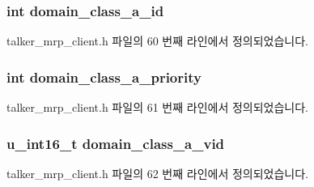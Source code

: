 \subsubsection[{\texorpdfstring{domain\+\_\+class\+\_\+a\+\_\+id}{domain_class_a_id}}]{\setlength{\rightskip}{0pt plus 5cm}int domain\+\_\+class\+\_\+a\+\_\+id}\hypertarget{structmrp__talker__ctx_a6e4374793667e90915abfe73f0e6201c}{}\label{structmrp__talker__ctx_a6e4374793667e90915abfe73f0e6201c}


talker\+\_\+mrp\+\_\+client.\+h 파일의 60 번째 라인에서 정의되었습니다.

\subsubsection[{\texorpdfstring{domain\+\_\+class\+\_\+a\+\_\+priority}{domain_class_a_priority}}]{\setlength{\rightskip}{0pt plus 5cm}int domain\+\_\+class\+\_\+a\+\_\+priority}\hypertarget{structmrp__talker__ctx_ac98b99ec0ffd190c1da93e6caffe36d4}{}\label{structmrp__talker__ctx_ac98b99ec0ffd190c1da93e6caffe36d4}


talker\+\_\+mrp\+\_\+client.\+h 파일의 61 번째 라인에서 정의되었습니다.

\subsubsection[{\texorpdfstring{domain\+\_\+class\+\_\+a\+\_\+vid}{domain_class_a_vid}}]{\setlength{\rightskip}{0pt plus 5cm}u\+\_\+int16\+\_\+t domain\+\_\+class\+\_\+a\+\_\+vid}\hypertarget{structmrp__talker__ctx_ac575246135a50baaf0c802ef29aa2779}{}\label{structmrp__talker__ctx_ac575246135a50baaf0c802ef29aa2779}


talker\+\_\+mrp\+\_\+client.\+h 파일의 62 번째 라인에서 정의되었습니다.

